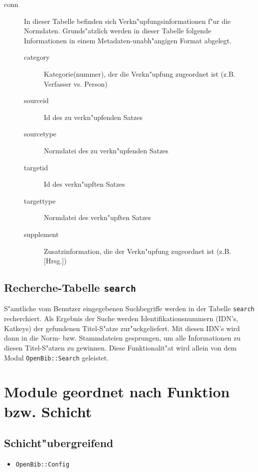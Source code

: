 \documentclass[11pt, twoside, a4paper, BCOR8mm, DIV12, bibtotoc,idxtotoc]{scrbook}
\begin{document}
\begin{itemize}
\begin{description}
\item[conn] In dieser Tabelle befinden sich
  Verkn"upfungsinformationen f"ur die Normdaten. 
  Grunds"atzlich werden in dieser Tabelle folgende Informationen in
  einem Metadaten-unabh"angigen Format abgelegt.
  \begin{description}
  \item[category] Kategorie(nummer), der die Verkn"upfung zugeordnet
    ist (z.B. Verfasser vs. Person)
  \item[sourceid] Id des zu verkn"upfenden Satzes
  \item[sourcetype] Normdatei des zu verkn"upfenden Satzes
  \item[targetid] Id des verkn"upften Satzes
  \item[targettype] Normdatei des verkn"upften Satzes
  \item[supplement] Zusatzinformation, die der Verkn"upfung zugeordnet
    ist (z.B. [Hrsg.])
  \end{description}
\end{description}


\section{Recherche-Tabelle \texttt{search}}

S"amtliche vom Benutzer eingegebenen Suchbegriffe werden in der Tabelle
\texttt{search} recherchiert. Als Ergebnis der Suche werden
Identifikationsnummern (IDN's, Katkeys) der gefundenen Titel-S"atze
zur"uckgeliefert. Mit diesen IDN's wird dann in die Norm- bzw.
Stammdateien gesprungen, um alle Informationen zu diesen Titel-S"atzen
zu gewinnen. Diese Funktionalit"at wird allein von dem Modul
\texttt{OpenBib::Search} geleistet.

\chapter{Module geordnet nach Funktion bzw. Schicht}


\section{Schicht"ubergreifend}


\begin{itemize}
\item \texttt{OpenBib::Config}
\end{itemize}


\end{itemize}
\end{document}

